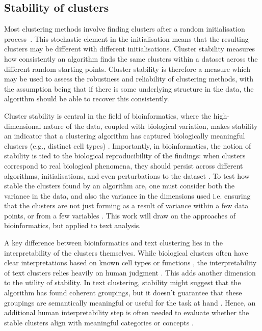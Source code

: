 \documentclass{article}
\begin{document}
\subsection*{Stability of clusters}
Most clustering methods involve finding clusters after a random initialisation process~\cite{ahmedKmeansAlgorithmComprehensive2020, hosseiniAlternativeEMGaussian2020}.  
This stochastic element in the initialisation means that the resulting clusters may be different with different initialisations. Cluster stability measures how consistently an algorithm finds the same clusters within a dataset across the different random starting points.  Cluster stability is therefore a measure which may be used to assess the robustness and reliability of clustering methods, with the assumption being that if there is some underlying structure in the data, the algorithm should be able to recover this consistently.  




Cluster stability is central in the field of bioinformatics, where the high-dimensional nature of the data, coupled with biological variation, makes stability an indicator that a clustering algorithm has captured biologically meaningful clusters (e.g., distinct cell types) \cite{kiselevChallengesUnsupervisedClustering2019}. 
Importantly, in bioinformatics, the notion of stability is tied to the biological reproducibility of the findings: when clusters correspond to real biological phenomena, they should persist across different algorithms, initialisations, and even perturbations to the dataset \cite{handlComputationalClusterValidation2005, ronanAvoidingCommonPitfalls2016}. To test how stable the clusters found by an algorithm are, one must consider both the variance in the data, and also the variance in the dimensions used i.e. ensuring that the clusters are not just forming as a result of variance within a few data points, or from a few variables \cite{yu2022benchmarking}.  This work will draw on the approaches of bioinformatics, but applied to text analysis.


A key difference between bioinformatics and text clustering lies in the interpretability of the clusters themselves. While biological clusters often have clear interpretations based on known cell types or functions \cite{qiClusteringClassificationMethods2020}, the interpretability of text clusters relies heavily on human judgment \cite{JMLR:v18:17-069}. 
This adds another dimension to the utility of stability. In text clustering, stability might suggest that the algorithm has found coherent groupings, but it doesn’t guarantee that these groupings are semantically meaningful or useful for the task at hand \cite{ahmedKmeansAlgorithmComprehensive2020}. Hence, an additional human interpretability step is often needed to evaluate whether the stable clusters align with meaningful categories or concepts \cite{kuncheva2006evaluation}.
\end{document}
